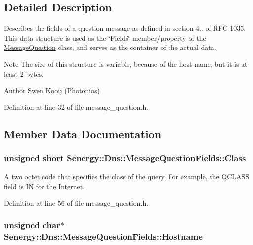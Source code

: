 \subsection{Detailed Description}
Describes the fields of a question message as defined in section 4.. of R\-F\-C-\/1035. This data structure is used as the \char`\"{}\-Fields\char`\"{} member/property of the \hyperlink{class_senergy_1_1_dns_1_1_message_question}{Message\-Question} class, and serves as the container of the actual data. 

\begin{DoxyNote}{Note}
The size of this structure is variable, because of the host name, but it is at least 2 bytes.
\end{DoxyNote}
\begin{DoxyAuthor}{Author}
Swen Kooij (Photonios) 
\end{DoxyAuthor}


Definition at line 32 of file message\-\_\-question.\-h.



\subsection{Member Data Documentation}
\hypertarget{struct_senergy_1_1_dns_1_1_message_question_fields_a3287d0766033d31e14623d864348bd84}{
\subsubsection[{Class}]{\setlength{\rightskip}{0pt plus 5cm}unsigned short Senergy\-::\-Dns\-::\-Message\-Question\-Fields\-::\-Class}}\label{struct_senergy_1_1_dns_1_1_message_question_fields_a3287d0766033d31e14623d864348bd84}


A two octet code that specifies the class of the query. For example, the Q\-C\-L\-A\-S\-S field is I\-N for the Internet. 



Definition at line 56 of file message\-\_\-question.\-h.

\hypertarget{struct_senergy_1_1_dns_1_1_message_question_fields_a0d4513020862cecabd53e86ba5d9e05d}{
\subsubsection[{Hostname}]{\setlength{\rightskip}{0pt plus 5cm}unsigned char$\ast$ Senergy\-::\-Dns\-::\-Message\-Question\-Fields\-::\-Hostname}}\label{struct_senergy_1_1_dns_1_1_message_question_fields_a0d4513020862cecabd53e86ba5d9e05d}


